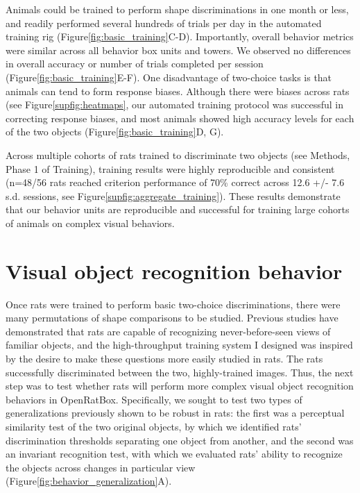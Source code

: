 Animals could be trained to perform shape discriminations in one month or less, and readily performed several hundreds of trials per day in the automated training rig (Figure\ref{fig:basic_training}C-D). Importantly, overall behavior metrics were similar across all behavior box units and towers. We observed no differences in overall accuracy or number of trials completed per session (Figure\ref{fig:basic_training}E-F). One disadvantage of two-choice tasks is that animals can tend to form response biases. Although there were biases across rats (see Figure\ref{supfig:heatmaps}, our automated training protocol was successful in correcting response biases, and most animals showed high accuracy levels for each of the two objects (Figure\ref{fig:basic_training}D, G). 

Across multiple cohorts of rats trained to discriminate two objects (see Methods, Phase 1 of Training), training results were highly reproducible and consistent (n=48/56 rats reached criterion performance of 70\% correct across 12.6 +/- 7.6 s.d. sessions, see Figure\ref{supfig:aggregate_training}). These results demonstrate that our behavior units are reproducible and successful for training large cohorts of animals on complex visual behaviors.

\section{Visual object recognition behavior}
Once rats were trained to perform basic two-choice discriminations, there were many permutations of shape comparisons to be studied. Previous studies have demonstrated that rats are capable of recognizing never-before-seen views of familiar objects\cite{Zoccolan2009, Vermaercke2012, Tafazoli2012}, and the high-throughput training system I designed was inspired by the desire to make these questions more easily studied in rats. The rats successfully discriminated between the two, highly-trained images. Thus, the next step was to test whether rats will perform more complex visual object recognition behaviors in OpenRatBox. Specifically, we sought to test two types of generalizations previously shown to be robust in rats\cite{Zoccolan2009, Tafazoli2012}: the first was a perceptual similarity test of the two original objects, by which we identified rats’ discrimination thresholds separating one object from another, and the second was an invariant recognition test, with which we evaluated rats' ability to recognize the objects across changes in particular view (Figure\ref{fig:behavior_generalization}A). 

